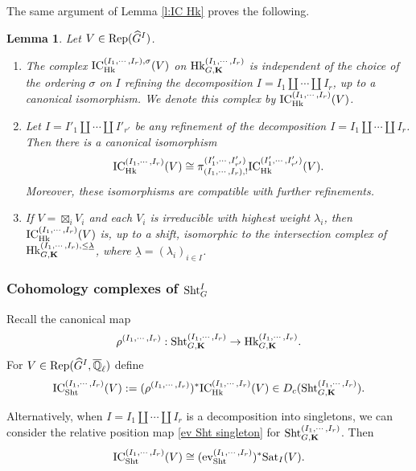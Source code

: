 \documentclass[11pt]{amsart}
\numberwithin{equation}{section}
\theoremstyle{plain}
\newtheorem{lemma}[subsubsection]{Lemma}
\theoremstyle{definition}
\def\QQ{\mathbb{Q}}
\def\bK{\mathbf{K}}
\def\dG{\widehat{G}}
\newcommand\ev{\textup{ev}}
\newcommand{\Hk}{\textup{Hk}}
\newcommand\IC{\textup{IC}}
\newcommand\Rep{\textup{Rep}}
\newcommand\Sht{\textup{Sht}}
\newcommand{\Qlbar}{\overline{\QQ}_\ell}
\newcommand\un{\underline}
\newcommand\sss{\subsubsection}
\renewcommand\r\rho
\newcommand{\s}{\sigma}
\renewcommand{\l}{\lambda}
\newcommand{\Sat}{\mathrm{Sat}}
\begin{document}
The same argument of Lemma \ref{l:IC Hk} proves the following.

\begin{lemma}\label{l:IC Hk refine} Let $V\in \Rep(\dG^{I})$.
\begin{enumerate}
\item The complex $\IC^{(I_{1},\cdots, I_{r}),\s}_{\Hk}(V)$ on $\Hk^{(I_{1},\cdots, I_{r})}_{G,\bK}$ is independent of the choice of the ordering $\s$ on $I$ refining the decomposition $I=I_{1}\coprod\cdots \coprod I_{r}$, up to a canonical isomorphism. We denote this complex by $\IC^{(I_{1},\cdots, I_{r})}_{\Hk}(V)$.

\item Let $I=I'_{1}\coprod\cdots \coprod I'_{r'}$ be any refinement of the decomposition  $I=I_{1}\coprod\cdots \coprod I_{r}$. Then there is a canonical isomorphism
\begin{equation*}
\IC^{(I_{1},\cdots, I_{r})}_{\Hk}(V)\cong \pi^{(I'_{1},\cdots, I'_{r'})}_{(I_{1},\cdots, I_{r}), !}\IC^{(I'_{1},\cdots, I'_{r'})}_{\Hk}(V).
\end{equation*}
Moreover, these isomorphisms are compatible with further refinements.

\item If $V=\boxtimes_{i}V_{i}$ and each $V_{i}$ is irreducible with highest weight $\l_{i}$, then $\IC^{(I_{1},\cdots, I_{r})}_{\Hk}(V)$ is, up to a shift, isomorphic to the intersection complex of $\Hk^{(I_{1},\cdots, I_{r}),\le\un\l}_{G,\bK}$, where $\un\l=(\l_{i})_{i\in I}$.
\end{enumerate}
\end{lemma}






\sss{Cohomology complexes of $\Sht^{I}_{G}$}
Recall the canonical map
\begin{equation*}
\r^{(I_{1},\cdots, I_{r})}: \Sht^{(I_{1},\cdots, I_{r})}_{G,\bK}\to \Hk^{(I_{1},\cdots, I_{r})}_{G,\bK}.
\end{equation*}
For $V\in \Rep(\dG^{I}, \Qlbar)$ define
\begin{equation*}
\IC^{(I_{1},\cdots, I_{r})}_{\Sht}(V):=(\r^{(I_{1},\cdots, I_{r})})^{*}\IC^{(I_{1},\cdots, I_{r})}_{\Hk}(V)\in D_{c}(\Sht^{(I_{1},\cdots, I_{r})}_{G,\bK}).
\end{equation*}

Alternatively, when $I=I_{1}\coprod\cdots \coprod I_{r}$ is a decomposition into singletons, we can consider the relative position map \eqref{ev Sht singleton} for $\Sht^{(I_{1},\cdots, I_{r})}_{G,\bK}$.
Then
\begin{equation*}
\IC^{(I_{1},\cdots, I_{r})}_{\Sht}(V)\cong (\ev_{\Sht}^{(I_{1},\cdots, I_{r})})^{*}\Sat_{I}(V).
\end{equation*}
\end{document}
